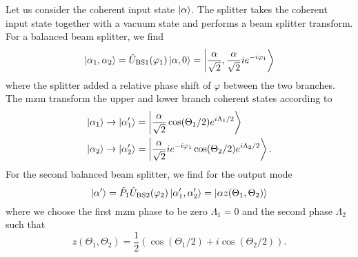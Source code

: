 Let us consider the coherent input state $\ket{\alpha}$.
The splitter takes the coherent input state together with a vacuum state and performs a beam splitter transform.
For a balanced beam splitter, we find
\begin{equation}
	\ket{\alpha_1,\alpha_2}
	=
	\hat{U}_\text{BS1}(\varphi_1)
	\ket{\alpha,0}
	=
	\ket{\frac{\alpha}{\sqrt{2}},\frac{\alpha}{\sqrt{2}}ie^{-i\varphi_1}}
\end{equation}
where the splitter added a relative phase shift of $\varphi$ between the two branches.
The \gls{mzm} transform the upper and lower branch coherent states according to
\begin{align}
	\ket{\alpha_1}
	&\to
	\ket{\alpha_1^\prime}
	=
	\ket{\frac{\alpha}{\sqrt{2}}\cos(\Theta_1/2)e^{i\Lambda_1/2}}
	\\
	\ket{\alpha_2}
	&\to
	\ket{\alpha_2^\prime}
	=
	\ket{\frac{\alpha}{\sqrt{2}}ie^{-i\varphi_1}\cos(\Theta_2/2)e^{i\Lambda_2/2}}
	.
\end{align}
For the second balanced beam splitter, we find for the output mode
\begin{equation}
	\ket{\alpha^\prime}
	=
	\hat{P}_1
	\hat{U}_\text{BS2}(\varphi_2)
	\ket{\alpha_1^\prime,\alpha_2^\prime}
	=
	\ket{\alpha z(\Theta_1,\Theta_2)}
\end{equation}
where we choose the first \gls{mzm} phase to be zero $\Lambda_1=0$ and the second phase $\Lambda_2$ such that
\begin{equation}
	z(\Theta_1,\Theta_2)
	=
	\frac{1}{2}
	\left(
		\cos(\Theta_1/2)
		+
		i\cos(\Theta_2/2)
	\right)
	.
\end{equation}